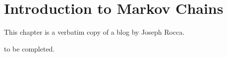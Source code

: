 
\chapter{Introduction to Markov Chains}
\label{chap:IntroductiontoMarkovChains}

This chapter is a verbatim copy of a blog \cite{JosephRoccaMarkovChains2019} by Joseph Rocca.

to be completed.
